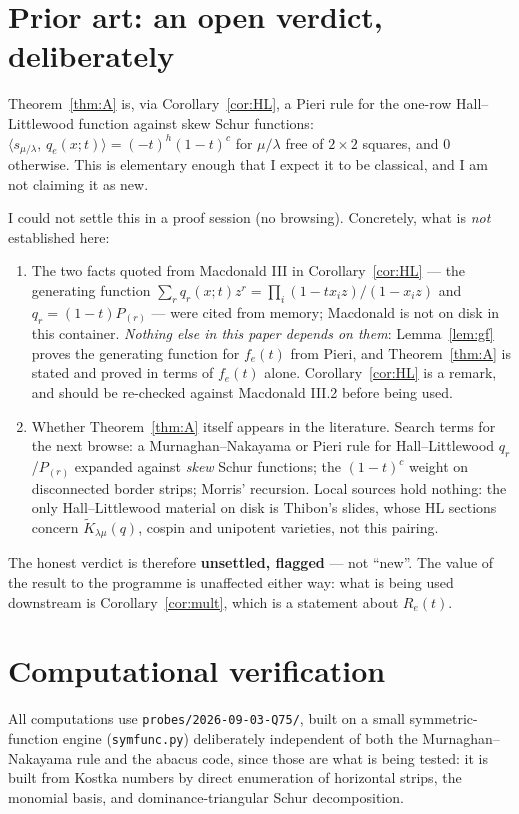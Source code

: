 \documentclass[11pt]{article}
\theoremstyle{definition}
\begin{document}
\section{Prior art: an open verdict, deliberately}\label{sec:prior}

Theorem~\ref{thm:A} is, via Corollary~\ref{cor:HL}, a Pieri rule for the one-row
Hall--Littlewood function against skew Schur functions:
$\langle s_{\mu/\lambda},\,q_e(x;t)\rangle=(-t)^{h}(1-t)^{c}$ for $\mu/\lambda$ free of
$2\times2$ squares, and $0$ otherwise. This is elementary enough that I expect it to be
classical, and I am not claiming it as new.

I could not settle this in a proof session (no browsing). Concretely, what is
\emph{not} established here:
\begin{enumerate}
\item The two facts quoted from Macdonald III in Corollary~\ref{cor:HL} --- the generating
function $\sum_rq_r(x;t)z^r=\prod_i(1-tx_iz)/(1-x_iz)$ and $q_r=(1-t)P_{(r)}$ --- were cited
from memory; Macdonald is not on disk in this container. \emph{Nothing else in this paper
depends on them}: Lemma~\ref{lem:gf} proves the generating function for $f_e(t)$ from Pieri, and
Theorem~\ref{thm:A} is stated and proved in terms of $f_e(t)$ alone. Corollary~\ref{cor:HL} is a
remark, and should be re-checked against Macdonald III.2 before being used.
\item Whether Theorem~\ref{thm:A} itself appears in the literature. Search terms for the next
browse: a Murnaghan--Nakayama or Pieri rule for Hall--Littlewood $q_r$/$P_{(r)}$ expanded
against \emph{skew} Schur functions; the $(1-t)^{c}$ weight on disconnected border strips; Morris'
recursion. Local sources hold nothing: the only Hall--Littlewood material on disk is Thibon's
slides, whose HL sections concern $\tilde K_{\lambda\mu}(q)$, cospin and unipotent varieties,
not this pairing.
\end{enumerate}
The honest verdict is therefore \textbf{unsettled, flagged} --- not ``new''. The value of the
result to the programme is unaffected either way: what is being used downstream is
Corollary~\ref{cor:mult}, which is a statement about $R_e(t)$.

\section{Computational verification}

All computations use \texttt{probes/2026-09-03-Q75/}, built on a small symmetric-function engine
(\texttt{symfunc.py}) deliberately independent of both the Murnaghan--Nakayama rule and the
abacus code, since those are what is being tested: it is built from Kostka numbers by direct
enumeration of horizontal strips, the monomial basis, and dominance-triangular Schur
decomposition.
\end{document}
